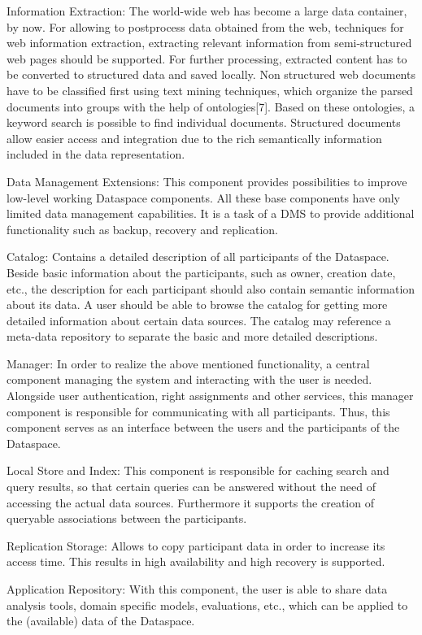Information Extraction: The world-wide web has become a large data container, by now. For allowing to postprocess data obtained from the web, techniques for web information extraction, extracting relevant information from semi-structured web pages should be supported. For further processing, extracted content has to be converted to structured data and saved locally. Non structured web documents have to be classified first using text mining techniques, which organize the parsed documents into groups with the help of ontologies[7]. Based on these ontologies, a keyword search is possible to find individual documents. Structured documents allow easier access and integration due to the rich semantically information included in the data representation.  

Data Management Extensions: This component provides possibilities to improve low-level working Dataspace components. All these base components have only limited data management capabilities. It is a task of a DMS to provide additional functionality such as backup, recovery and replication. 

Catalog: Contains a detailed description of all participants of the Dataspace. Beside basic information about the participants, such as owner, creation date, etc., the description for each participant should also contain semantic information about its data. A user should be able to browse the catalog for getting more detailed information about certain data sources. The catalog may reference a meta-data repository to separate the basic and more detailed descriptions.

Manager: In order to realize the above mentioned functionality, a central component managing the system and interacting with the user is needed. Alongside user authentication, right assignments and other services, this manager component is responsible for communicating with all participants. Thus, this component serves as an interface between the users and the participants of the Dataspace.

Local Store and Index: This component is responsible for caching search and query results, so that certain queries can be answered without the need of accessing the actual data sources. Furthermore it supports the creation of queryable associations between the participants.

Replication Storage: Allows to copy participant data in order to increase its access time. This results in high availability and high recovery is supported.

Application Repository: With this component, the user is able to share data analysis tools, domain specific models, evaluations, etc., which can be applied to the (available) data of the Dataspace.



